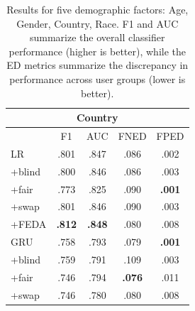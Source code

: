 \begin{table}[t!]
\begin{tabular}{l||cc|cc}
\multicolumn{5}{c}{\bf Country} \\\hline
&F1&AUC&FNED&FPED\\\hline\hline
LR& .801 & .847 & .086 & .002\\
+blind& .800 & .846 & .086 & .003\\
+fair& .773 & .825 & .090 & \bf .001\\
+swap& .801 & .846 & .090 & .003\\
+FEDA& \bf .812 & \bf .848 & .080 & .008\\
\hline
GRU & .758 & .793 & .079 & \bf .001 \\
+blind& .759 & .791 & .109 & .003\\
+fair& .746 & .794 & \bf .076 & .011\\
+swap& .746 & .780 & .080 & .008 \\\hline
\end{tabular}


\caption{Results for five demographic factors: Age, Gender, Country, Race. F1 and AUC summarize the overall classifier performance (higher is better), while the ED metrics summarize the discrepancy in performance across user groups (lower is better). 
}
\label{chap5:tab:da_all}
\end{table}

